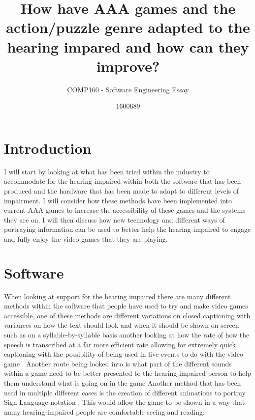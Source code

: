 \documentclass{scrartcl}
\title{How have AAA games and the action/puzzle genre adapted to the hearing impared and how can they improve?}
\subtitle{COMP160 - Software Engineering Essay}
\author{1600689}
\begin{document}
\maketitle


\section{Introduction}

I will start by looking at what has been tried within the industry to accommodate for the hearing-impaired within both the software that has been produced and the hardware that has been made to adapt to different levels of impairment. I will consider how these methods have been implemented into current AAA games to increase the accessibility of these games and the systems they are on. I will then discuss how new technology and different ways of portraying information can be used to better help the hearing-impaired to engage and fully enjoy the video games that they are playing.

\section{Software}

When looking at support for the hearing impaired there are many different methods within the software that people have used to try and make video games accessible, one of these methods are different variations on closed captioning with variances on how the text should look and when it should be shown on screen \cite{Coutinho} such as on a syllable-by-syllable basis \cite{Sargent} another looking at how the rate of how the speech is transcribed at a far more efficient rate allowing for extremely quick captioning with the possibility of being used in live events to do with the video game \cite{Lasecki}. Another route being looked into is what part of the different sounds within a game need to be better presented to the hearing-impaired person to help them understand what is going on in the game \cite{Hiraga}
Another method that has been used in multiple different cases is the creation of different animations to portray Sign Language notation \cite{Bouzid} \cite{Namatame}, This would allow the game to be shown in a way that many hearing-impaired people are comfortable seeing and reading.
\end{document}

